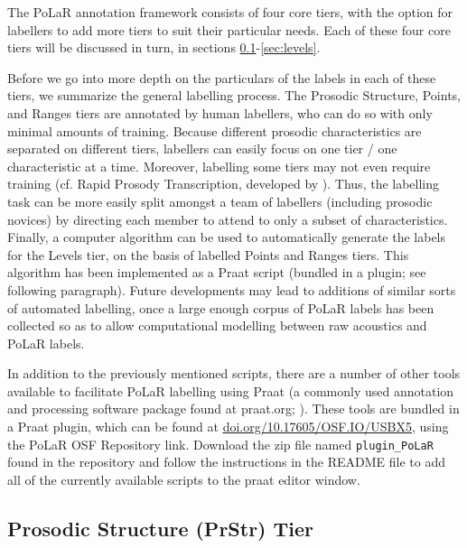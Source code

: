 The PoLaR annotation framework consists of four core tiers, with the option for labellers to add more tiers to suit their particular needs. Each of these four core tiers will be discussed in turn, in sections \ref{sec:prosodic-structure-prstr}-\ref{sec:levels}.

Before we go into more depth on the particulars of the labels in each of these tiers, we summarize the general labelling process. The Prosodic Structure, Points, and Ranges tiers are annotated by human labellers, who can do so with only minimal amounts of training. Because different prosodic characteristics are separated on different tiers, labellers can easily focus on one tier / one characteristic at a time. Moreover, labelling some tiers may not even require training (cf. Rapid Prosody Transcription, developed by \citealt{cole-14}). Thus, the labelling task can be more easily split amongst a team of labellers (including prosodic novices) by directing each member to attend to only a subset of characteristics. Finally, a computer algorithm can be used to automatically generate the labels for the Levels tier, on the basis of labelled Points and Ranges tiers. This algorithm has been implemented as a Praat script (bundled in a plugin; see following paragraph). Future developments may lead to additions of similar sorts of automated labelling, once a large enough corpus of PoLaR labels has been collected so as to allow computational modelling between raw acoustics and PoLaR labels.

In addition to the previously mentioned scripts, there are a number of other tools available to facilitate PoLaR labelling using Praat (a commonly used annotation and processing software package found at praat.org; \citealt{praat}). These tools are bundled in a Praat plugin, which can be found at \href{https://doi.org/10.17605/OSF.IO/USBX5}{\uline{doi.org/10.17605/OSF.IO/USBX5}}, using the PoLaR OSF Repository link. Download the zip file named \texttt{plugin\_PoLaR} found in the repository and follow the instructions in the README file to add all of the currently available scripts to the praat editor window.

\subsection{Prosodic Structure (PrStr) Tier}\label{sec:prosodic-structure-prstr}

